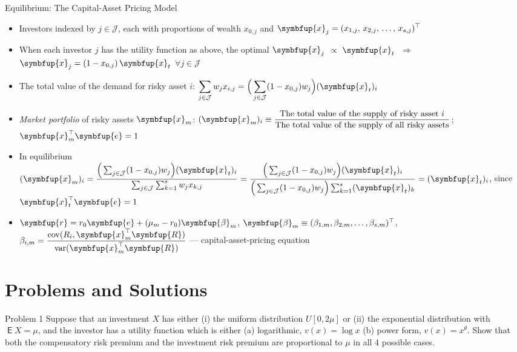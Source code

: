 \documentclass[10pt]{beamer}
\newcommand{\ds}{\displaystyle}
\newcommand{\ie}{\;\Longrightarrow\;}
\newcommand{\vx}{\symbfup{x}}
\newcommand{\vbb}{\symbfup{\beta}}
\newcommand{\vR}{\symbfup{R}}
\newcommand{\ve}{\symbfup{e}}
\newcommand{\vr}{\symbfup{r}}
\DeclareMathOperator\expc{\mathsf{E}}
\DeclareMathOperator\var{var}
\DeclareMathOperator\cov{cov}
\theoremstyle{definition}
\begin{document}
\begin{frame}{Equilibrium: The Capital-Asset Pricing Model}
  \begin{itemize}[<+->]
    \item Investors indexed by $\ds j\in\mathcal{J}$, each with proportions of wealth $x_{0, j}$ and $\ds\vx_j = (x_{1, j},\,x_{2, j},\,\ldots,\,x_{s, j})^\top$ 
    \item When each investor $j$ has the utility function as above, the optimal $\ds\vx_j$ $\propto$ $\ds\vx_t$ $\ie$ $\ds\vx_j = (1 - x_{0, j})\,\vx_t$ $\forall j\in\mathcal{J}$
    \item The total value of the demand for risky asset $i$: $\ds\sum_{j\in\mathcal{J}} w_j x_{i, j} = \Big(\sum_{j\in\mathcal{J}}(1 - x_{0, j})w_j\Big)(\vx_t)_i$ 
    \item \emph{Market portfolio} of risky assets $\vx_m$: $\ds (\vx_m)_i\equiv\frac{\text{The total value of the supply of risky asset $i$}}{\text{The total value of the supply of all risky assets}}$; $\vx^\top_m\ve = 1$
    \item In equilibrium $\ds(\vx_m)_i =  \frac{\Big(\sum_{j\in\mathcal{J}}(1 - x_{0, j})w_j\Big)(\vx_t)_i}{\sum_{j\in\mathcal{J}}\sum_{k=1}^s w_j x_{k, j}} = \frac{\Big(\sum_{j\in\mathcal{J}}(1 - x_{0, j})w_j\Big)(\vx_t)_i}{\Big(\sum_{j\in\mathcal{J}}(1 - x_{0, j})w_j\Big)\sum_{k=1}^s(\vx_t)_k} = (\vx_t)_i$, since $\vx^\top_t\ve = 1$
    \item $\vr = r_0\ve + (\mu_m - r_0)\vbb_m$, $\vbb_m\equiv(\beta_{1, m}, \beta_{2, m}, \ldots, \beta_{s, m})^\top$, $\ds\beta_{i, m} = \frac{\cov(R_i, \vx^\top_m\vR)}{\var(\vx^\top_m\vR)}$ --- capital-asset-pricing equation
  \end{itemize}
\end{frame}

\section{Problems and Solutions}

\begin{frame}{Problem 1}
  Suppose that an investment $X$ has either (i) the uniform distribution $U[0, 2\mu]$ or (ii) the exponential distribution with $\expc X = \mu$, and the investor has a utility function which is either (a) logarithmic, $v(x) = \log x$ (b) power form, $v(x) = x^\theta$. Show that both the compensatory risk premium and the investment risk premium are proportional to $\mu$ in all 4 possible cases.
\end{frame}
\end{document}
